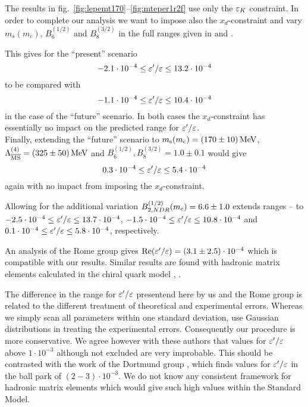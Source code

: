 The results in fig.\ \ref{fig:lepemt170}--\ref{fig:mteper1r2f}
use only the $\varepsilon_K$ constraint. In order to complete our analysis we
want to impose also the $x_d$-constraint and vary $m_s(m_c)$,
$B^{(1/2)}_6$ and $B^{(3/2)}_8$ in the full ranges given in
 and .

This gives for the ``present'' scenario
\begin{equation}
-2.1 \cdot 10^{-4} \le \varepsilon'/\varepsilon \le 13.2 \cdot 10^{-4}
\label{eq:eperangepresent}
\end{equation}
to be compared with
\begin{equation}
-1.1 \cdot 10^{-4} \le \varepsilon'/\varepsilon \le 10.4 \cdot 10^{-4}
\label{eq:eperangefuture}
\end{equation}
in the case of the ``future'' scenario. In both cases the
$x_d$-constraint has essentially no impact on the predicted range for
$\varepsilon'/\varepsilon$.
\\
Finally, extending the ``future'' scenario to $m_{\rm s}(m_{\rm c})=(170 \pm
10)\, {\rm MeV}$, $\Lambda_{\overline{\rm MS}}^{(4)}=(325 \pm 50)\, {\rm MeV}$ and $B^{(1/2)}_6,
B^{(3/2)}_8=1.0 \pm 0.1$ would give
\begin{equation}
0.3 \cdot 10^{-4} \le \varepsilon'/\varepsilon \le 5.4 \cdot 10^{-4}
\label{eq:eperangefuture2}
\end{equation}
again with no impact from imposing the $x_d$-constraint.

Allowing for the additional variation $B_{2,NDR}^{(1/2)}(m_{\rm c}) = 6.6 \pm
1.0$ extends ranges --
to $-2.5 \cdot 10^{-4} \le \varepsilon'/\varepsilon \le 13.7 \cdot 10^{-4}$, $-1.5 \cdot
10^{-4} \le \varepsilon'/\varepsilon \le 10.8 \cdot 10^{-4}$ and $0.1 \cdot 10^{-4} \le
\varepsilon'/\varepsilon \le 5.8 \cdot 10^{-4}$, respectively.

An analysis of the Rome group \cite{ciuchini:95} gives
${\rm Re}(\varepsilon'/\varepsilon)=(3.1\pm 2.5)\cdot 10^{-4}$ which is compatible with our
results. Similar results are found with hadronic matrix elements
calculated in the chiral quark model \cite{bertolinietal:94},
\cite{bertolinietal:95}.

The difference in the range for $\varepsilon'/\varepsilon$ presentend here by us and the
Rome group is related to the different treatment of theoretical and
experimental errors. Whereas we simply scan all parameters within one
standard deviation, \cite{ciuchini:95} use Gaussian distributions in
treating the experimental errors. Consequently our procedure is more
conservative. We agree however with these authors that values for
$\varepsilon'/\varepsilon$ above $1 \cdot 10^{-3}$ although not excluded are very
improbable. This should be contrasted with the work of the Dortmund
group \cite{froehlich:91}, \cite{heinrichetal:92} which finds values
for $\varepsilon'/\varepsilon$ in the ball park of $(2 - 3) \cdot 10^{-3}$. We do not know
any consistent framework for hadronic matrix elements which would give
such high values within the Standard Model.

